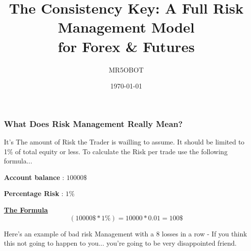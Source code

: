 \documentclass[10pt]{article}
\title{The Consistency Key: A Full Risk Management Model\\ for Forex \& Futures}
\author{MR5OBOT }
\date{\today}
\begin{document}
\maketitle
\noindent\hdashrule[0.2ex]{\linewidth}{0.1pt}{1mm} 



\subsubsection*{What Does Risk Management Really Mean?}
\vspace{0.1cm}
\begin{notebox}
\small It's The amount of Risk the Trader is wailling to assume. It should be limited to 1\% of total equity or less. To calculate the Risk per trade use the following formula...
\end{notebox}

\begin{itemize}
  \small{  \item \textbf{Account balance} : $ 10000\$ $}
  \small{  \item  \textbf{Percentage Risk} : $ 1\% $ }

\begin{center}
  \small{ \textbf{ \underline{The Formula}}}
  \[ ( 10000\$ * 1\% ) = 10000 * 0.01 = 100\$ \]
\end{center}
\end{itemize}

\begin{violetbox}
\small Here's an example of bad risk Management with  a 8 losses in a row - If you think this not going to happen to you... you're going to be very disappointed friend.
\end{violetbox}
\end{document}
